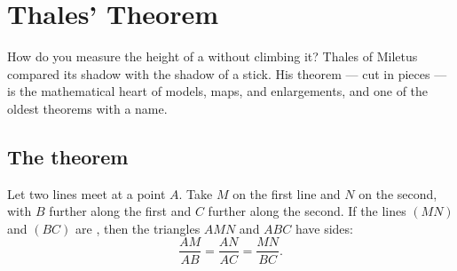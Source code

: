 \chapter{Thales' Theorem}\label{ch:g9:thales}

How do you measure the height of a  without climbing it? Thales
of Miletus compared its shadow with the shadow of a stick. His theorem
---  cut  in  pieces --- is the
mathematical heart of  models, maps, and enlargements, and one of
the oldest theorems with a name.

\section{The theorem}

\begin{theorem}[Thales]\label{thm:g9:thales:direct}
Let two lines meet at a point $A$. Take $M$ on the first line and $N$
on the second, with $B$ further along the first and $C$ further along
the second. If the lines $(MN)$ and $(BC)$ are \emph{}, then the
triangles $AMN$ and $ABC$ have  sides:
\[
\frac{AM}{AB} = \frac{AN}{AC} = \frac{MN}{BC}.
\]
\end{theorem}
\admitted

